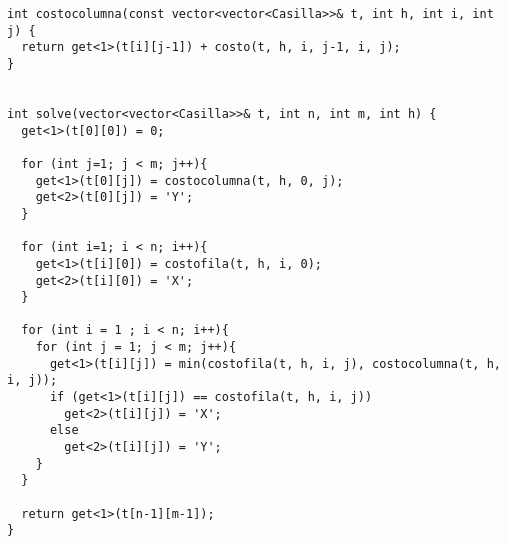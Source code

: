 \begin{lstlisting}[frame=single]
int costocolumna(const vector<vector<Casilla>>& t, int h, int i, int j) {
  return get<1>(t[i][j-1]) + costo(t, h, i, j-1, i, j);
}


int solve(vector<vector<Casilla>>& t, int n, int m, int h) {
  get<1>(t[0][0]) = 0;

  for (int j=1; j < m; j++){
    get<1>(t[0][j]) = costocolumna(t, h, 0, j);
    get<2>(t[0][j]) = 'Y';
  }

  for (int i=1; i < n; i++){
    get<1>(t[i][0]) = costofila(t, h, i, 0);
    get<2>(t[i][0]) = 'X';
  }

  for (int i = 1 ; i < n; i++){
    for (int j = 1; j < m; j++){
      get<1>(t[i][j]) = min(costofila(t, h, i, j), costocolumna(t, h, i, j));
      if (get<1>(t[i][j]) == costofila(t, h, i, j))
        get<2>(t[i][j]) = 'X';
      else
        get<2>(t[i][j]) = 'Y';
    }
  }

  return get<1>(t[n-1][m-1]);
}
\end{lstlisting}
